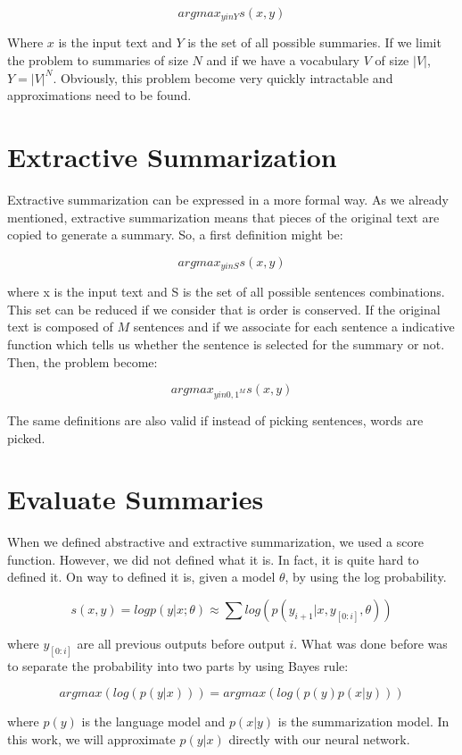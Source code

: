 \documentclass[11pt,a4paper,oldfontcommands]{memoir}
\begin{document}
\[argmax_{y in Y} s(x, y)\]

Where $x$ is the input text and $Y$ is the set of all possible summaries. If we limit the problem to summaries of size $N$ and if we have a vocabulary $V$ of size $|V|$, $Y = |V|^N$. Obviously, this problem become very quickly intractable and approximations need to be found.

\section{Extractive Summarization}

Extractive summarization can be expressed in a more formal way. As we already mentioned, extractive summarization means that pieces of the original text are copied to generate a summary. So, a first definition might be:

\[argmax_{y in S} s(x, y)\]

where x is the input text and S is the set of all possible sentences combinations. This set can be reduced if we consider that is order is conserved. If the original text is composed of $M$ sentences and if we associate for each sentence a indicative function which tells us whether the sentence is selected for the summary or not. Then, the problem become:

\[argmax_{y in {0,1}^M} s(x, y)\]


The same definitions are also valid if instead of picking sentences, words are picked.

\section{Evaluate Summaries}

When we defined abstractive and extractive summarization, we used a score function. However, we did not defined what it is. In fact, it is quite hard to defined it. On way to defined it is, given a model $\theta$, by using the log probability.

\[s(x, y) = log p(y|x; \theta) \approx \sum log(p(y_{i+1} | x, y_{[0:i]}, \theta))\]

where $y_[0:i]$ are all previous outputs before output $i$. What was done before was to separate the probability into two parts by using Bayes rule:

\[argmax(log(p(y|x))) = argmax(log(p(y)p(x|y)))\]

where $p(y)$ is the language model and $p(x|y)$ is the summarization model. In this work, we will approximate $p(y|x)$ directly with our neural network.
\end{document}
